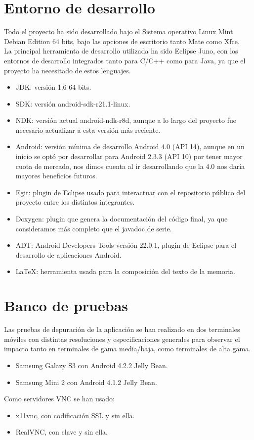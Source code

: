 \section{Entorno de desarrollo}
Todo el proyecto ha sido desarrollado bajo el Sistema operativo Linux Mint Debian Edition 64 bits, bajo las opciones de escritorio tanto Mate como Xfce.\\

La principal herramienta de desarrollo utilizada ha sido Eclipse Juno, con los entornos de desarrollo integrados tanto para C/C++ como para Java, ya que el proyecto ha necesitado de estos lenguajes.
\begin{itemize}
\item JDK: versión 1.6 64 bits.
\item SDK: versión android-sdk-r21.1-linux.
\item NDK: versión actual android-ndk-r8d, aunque a lo largo del proyecto fue necesario actualizar a esta versión más reciente.
\item Android: versión mínima de desarrollo Android 4.0 (API 14), aunque en un inicio se optó por desarrollar para Android 2.3.3 (API 10) por tener mayor cuota de mercado, nos dimos cuenta al ir desarrollando que la 4.0 nos daría mayores beneficios futuros.
\item Egit: plugin de Eclipse usado para interactuar con el repositorio público del proyecto entre los distintos integrantes.
\item Doxygen: plugin que genera la documentación del código final, ya que consideramos más completo que el javadoc de serie.
\item ADT: Android Developers Tools versión 22.0.1, plugin de Eclipse para el desarrollo de aplicaciones Android.
\item LaTeX: herramienta usada para la composición del texto de la memoria.
\end{itemize}
\newpage
\section{Banco de pruebas}
Las pruebas de depuración de la aplicación se han realizado en dos terminales móviles con distintas resoluciones y especificaciones generales para observar el impacto tanto en terminales de gama media/baja, como terminales de alta gama.
\begin{itemize}
\item Samsung Galazy S3 con Android 4.2.2 Jelly Bean.
\item Samsung Mini 2 con Android 4.1.2 Jelly Bean.
\end{itemize}

Como servidores VNC se han usado:
\begin{itemize}
\item x11vnc, con codificación SSL y sin ella.
\item RealVNC, con clave y sin ella.
\end{itemize}
